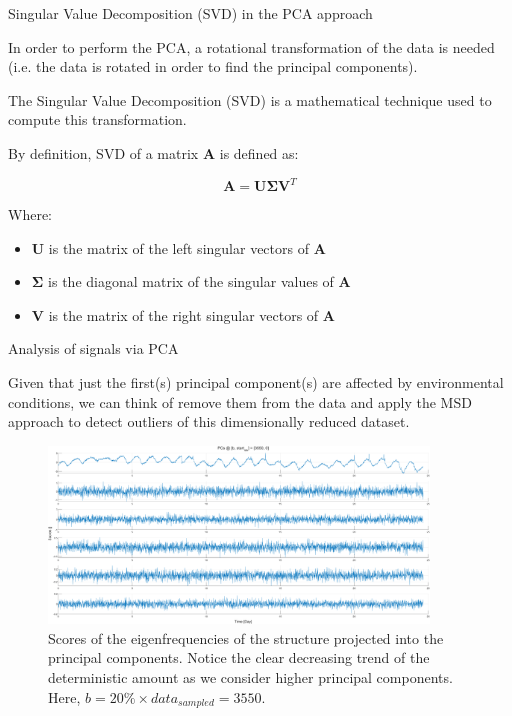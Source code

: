 \begin{frame}{Singular Value Decomposition (SVD) in the PCA approach}

    In order to perform the PCA, a rotational transformation of the data is needed (i.e. the data is rotated in order to find the principal components).

    The Singular Value Decomposition (SVD) is a mathematical technique used to compute this transformation.

    By definition, SVD of a matrix $\mathbf{A}$ is defined as:

    \begin{equation}
        \mathbf{A} = \mathbf{U} \mathbf{\Sigma} \mathbf{V}^T
    \end{equation}

    Where:
    \begin{itemize}
        \item $\mathbf{U}$ is the matrix of the left singular vectors of $\mathbf{A}$
        \item $\mathbf{\Sigma}$ is the diagonal matrix of the singular values of $\mathbf{A}$
        \item $\mathbf{V}$ is the matrix of the right singular vectors of $\mathbf{A}$
    \end{itemize}



\end{frame}



\begin{frame}{Analysis of signals via PCA}

    Given that just the first(s) principal component(s) are affected by environmental conditions, we can think of remove them from the data and apply the MSD approach to detect outliers of this dimensionally reduced dataset.

    \begin{figure}
        \centering
        \includegraphics[width=0.9\textwidth]{img/MATLAB/PCs_01.png}
        \caption{Scores of the eigenfrequencies of the structure projected into the principal components. Notice the clear decreasing trend of the deterministic amount as we consider higher principal components. Here, $b = 20\% \times data_{sampled} = 3550$.}
    \end{figure}

\end{frame}